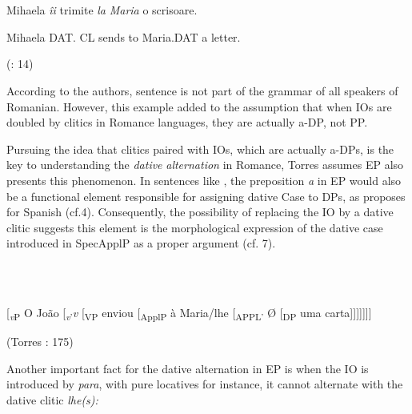 \documentclass[output=paper,modfonts,nonflat]{langsci/langscibook}
\begin{document}
\ea%
    \label{ex:key:6}
    \gll\\
        \\
    \glt
    \z

         Mihaela \textit{îi}               trimite   \textit{la} \textit{Maria}          o scrisoare.

     Mihaela DAT. CL  sends     to Maria.DAT  a letter.

      (\citealt{DiaconescuRivero2007}: 14)

According to the authors, sentence  is not part of the grammar of all speakers of Romanian. However, this example added to the assumption that when IOs are doubled by clitics in Romance languages, they are actually a-DP, not PP. 

Pursuing the idea that clitics paired with IOs, which are actually a-DPs, is the key to understanding the \textit{dative} \textit{alternation} in Romance, Torres \citet{Morais2007} assumes EP also presents this phenomenon. In sentences like , the preposition \textit{a} in EP would also be a functional element responsible for assigning dative Case to DPs, as \citet{Cuervo2003} proposes for Spanish (cf.4). Consequently, the possibility of replacing the IO by a dative clitic suggests this element is the morphological expression of the dative case introduced in SpecApplP as a proper argument (cf. 7). 

\begin{styleBodyTextii}
\ea%
    \label{ex:key:7}
    \gll\\
        \\
    \glt
    \z

         [\textit{\textsubscript{v}}\textsubscript{P} O João [\textit{\textsubscript{v}}\textsubscript{’}\textit{v} [\textsubscript{VP} enviou [\textsubscript{ApplP} à Maria/lhe [\textsubscript{APPL’} Ø [\textsubscript{DP} uma carta]]]]]]]  
\end{styleBodyTextii}

\begin{styleBodyTextii}
                                                                                                (Torres \citealt{Morais2007}: 175)
\end{styleBodyTextii}

Another important fact for the dative alternation in EP is when the IO is introduced by \textit{para}, with pure locatives for instance, it cannot alternate with the dative clitic \textit{lhe(s):}

\ea%
    \label{ex:key:8}
    \gll\\
        \\
    \glt
    \z
\end{document}
